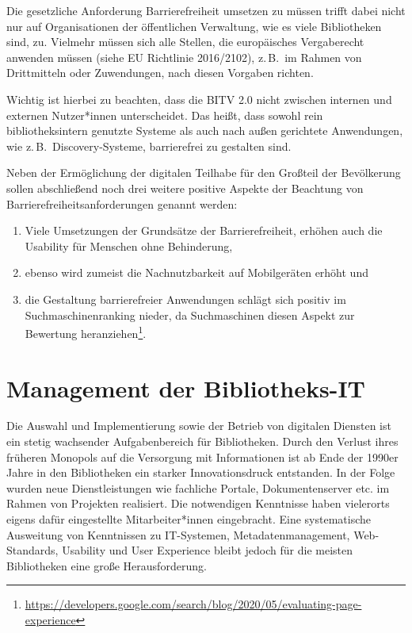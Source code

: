 \documentclass[
  11pt,
  letterpaper,
  DIV=11,
  twoside]{scrreprt}
\DeclareRobustCommand{\href}[2]{#2\footnote{\url{#1}}}
\begin{document}
Die gesetzliche Anforderung Barrierefreiheit umsetzen zu müssen trifft
dabei nicht nur auf Organisationen der öffentlichen Verwaltung, wie es
viele Bibliotheken sind, zu. Vielmehr müssen sich alle Stellen, die
europäisches Vergaberecht anwenden müssen (siehe EU Richtlinie
2016/2102), z.\,B.~im Rahmen von Drittmitteln oder Zuwendungen, nach
diesen Vorgaben richten.

Wichtig ist hierbei zu beachten, dass die BITV 2.0 nicht zwischen
internen und externen Nutzer*innen unterscheidet. Das heißt, dass sowohl
rein bibliotheksintern genutzte Systeme als auch nach außen gerichtete
Anwendungen, wie z.\,B.~Discovery-Systeme, barrierefrei zu gestalten
sind.

Neben der Ermöglichung der digitalen Teilhabe für den Großteil der
Bevölkerung sollen abschließend noch drei weitere positive Aspekte der
Beachtung von Barrierefreiheitsanforderungen genannt werden:

\begin{enumerate}
\def\labelenumi{\arabic{enumi}.}
\item
  Viele Umsetzungen der Grundsätze der Barrierefreiheit, erhöhen auch
  die Usability für Menschen ohne Behinderung,
\item
  ebenso wird zumeist die Nachnutzbarkeit auf Mobilgeräten erhöht und
\item
  die Gestaltung barrierefreier Anwendungen schlägt sich positiv im
  Suchmaschinenranking nieder, da
  \href{https://developers.google.com/search/blog/2020/05/evaluating-page-experience}{Suchmaschinen
  diesen Aspekt zur Bewertung heranziehen}.
\end{enumerate}

\section{Management der
Bibliotheks-IT}\label{management-der-bibliotheks-it}

Die Auswahl und Implementierung sowie der Betrieb von digitalen Diensten
ist ein stetig wachsender Aufgabenbereich für Bibliotheken. Durch den
Verlust ihres früheren Monopols auf die Versorgung mit Informationen ist
ab Ende der 1990er Jahre in den Bibliotheken ein starker
Innovationsdruck entstanden. In der Folge wurden neue Dienstleistungen
wie fachliche Portale, Dokumentenserver etc. im Rahmen von Projekten
realisiert. Die notwendigen Kenntnisse haben vielerorts eigens dafür
eingestellte Mitarbeiter*innen eingebracht. Eine systematische
Ausweitung von Kenntnissen zu IT-Systemen, Metadatenmanagement,
Web-Standards, Usability und User Experience bleibt jedoch für die
meisten Bibliotheken eine große Herausforderung.
\end{document}
